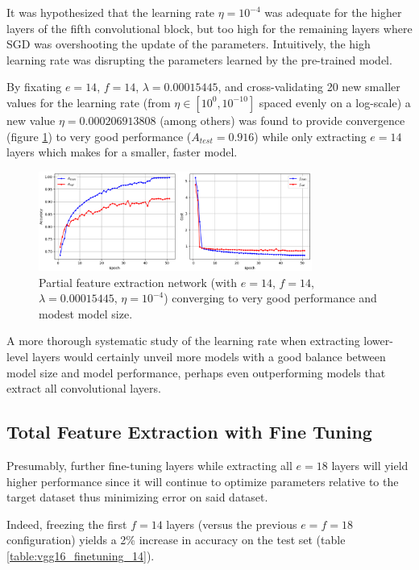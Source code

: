 It was hypothesized that the learning rate $\eta = 10^{-4}$ was adequate for the higher layers of the fifth convolutional block, but too high for the remaining layers where \ac{SGD} was overshooting the update of the parameters. Intuitively, the high learning rate was disrupting the parameters learned by the pre-trained model.

By fixating $e = 14$, $f = 14$, $\lambda = 0.00015445$, and cross-validating 20 new smaller values for the learning rate (from $\eta \in [10^0, 10^{-10}]$ spaced evenly on a log-scale) a new value $\eta = 0.000206913808$ (among others) was found to provide convergence (figure \ref{fig:vgg16_partial_convergence}) to very good performance ($A_{test} = 0.916$) while only extracting $e = 14$ layers which makes for a smaller, faster model.

\begin{figure}[ht]
    \centering
    \includegraphics[width=0.8\textwidth]{figs/vgg16_partial_convergence.png}
    \caption{Partial feature extraction network (with $e = 14$, $f = 14$, $\lambda = 0.00015445$, $\eta = 10^{-4}$) converging to very good performance and modest model size.}
    \label{fig:vgg16_partial_convergence}
\end{figure}

A more thorough systematic study of the learning rate when extracting lower-level layers would certainly unveil more models with a good balance between model size and model performance, perhaps even outperforming models that extract all convolutional layers.

\subsection{Total Feature Extraction with Fine Tuning}

Presumably, further fine-tuning layers while extracting all $e = 18$ layers will yield higher performance since it will continue to optimize parameters relative to the target dataset thus minimizing error on said dataset.

Indeed, freezing the first $f = 14$ layers (versus the previous $e = f = 18$ configuration) yields a 2\% increase in accuracy on the test set (table \ref{table:vgg16_finetuning_14}).


